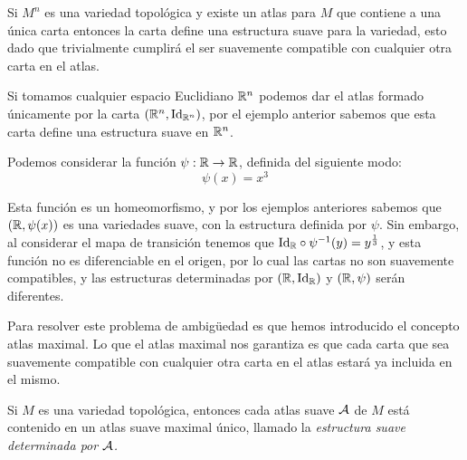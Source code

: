 \begin{example}\label{Ex: Variedad Suave - Carta Unica}
	Si $M^n$ es una variedad topológica y existe un atlas para $M$ que contiene a una única carta entonces la carta define una estructura suave para la variedad, esto dado que trivialmente cumplirá el ser suavemente compatible con cualquier otra carta en el atlas.
\end{example}


\begin{example}\label{Ex: Variedad Suave - Espacios Euclidianos}
	Si tomamos cualquier espacio Euclidiano $\mathbb{R}^n$ podemos dar el atlas formado únicamente por la carta $(\mathbb{R}^n,\mathrm{Id}_{\mathbb{R}^n})$, por el ejemplo anterior sabemos que esta carta define una estructura suave en $\mathbb{R}^n$.
\end{example}

\begin{example} %
	Podemos considerar la función $\psi: \mathbb{R} \to \mathbb{R}$, definida del siguiente modo:
	\[
		\psi(x) = x^3
	\]

	Esta función es un homeomorfismo, y por los ejemplos anteriores sabemos que $(\mathbb{R}, \psi(x))$ es una variedades suave, con la estructura definida por  $\psi$. Sin embargo, al considerar el mapa de transición tenemos que $\mathrm{Id}_{\mathbb{R}} \circ \psi^{-1}(y) = y^{\frac{1}{3}}$, y esta función no es diferenciable en el origen, por lo cual las cartas no son suavemente compatibles, y las estructuras determinadas por $(\mathbb{R}, \mathrm{Id}_{\mathbb{R}})$ y $(\mathbb{R},\psi)$ serán diferentes.

\end{example}

Para resolver este problema de ambigüedad es que hemos introducido el concepto atlas maximal. Lo que el atlas maximal nos garantiza es que cada carta que sea suavemente compatible con cualquier otra carta en el atlas estará ya incluida en el mismo.

\begin{theorem}
	Si $M$ es una variedad topológica, entonces cada atlas suave $\mathcal{A}$ de $M$ está contenido en un atlas suave maximal único, llamado la \it{estructura suave determinada por $\mathcal{A}$}.
\end{theorem}

